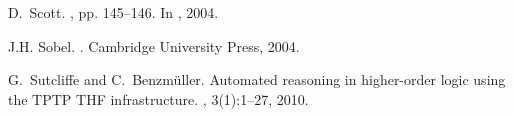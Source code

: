 \documentclass[11pt,a4paper]{article}
\begin{document}
\begin{thebibliography}{10}
D.~Scott.
, pp. 145--146.
\newblock In  \cite{sobel2004logic}, 2004.

J.H. Sobel.
.
\newblock Cambridge University Press, 2004.

G.~Sutcliffe and C.~Benzm{\"u}ller.
\newblock Automated reasoning in higher-order logic using the {TPTP THF}
  infrastructure.
, 3(1):1--27, 2010.


\end{thebibliography}
\end{document}
